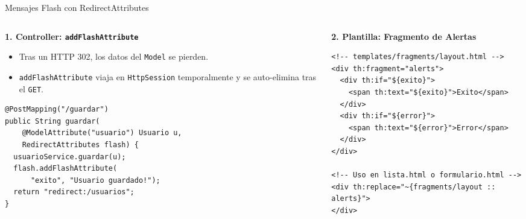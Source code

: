 \documentclass[aspectratio=169]{beamer}
\begin{document}
\begin{frame}[fragile]{Mensajes Flash con RedirectAttributes}
\begin{columns}[c]
\begin{column}{0.48\textwidth}
  \textbf{1. Controller: \texttt{addFlashAttribute}}
  \begin{itemize}
    \item Tras un HTTP 302, los datos del \texttt{Model} se pierden.
    \item \texttt{addFlashAttribute} viaja en \texttt{HttpSession} temporalmente y se auto-elimina tras el \texttt{GET}.
  \end{itemize}
\begin{lstlisting}[style=SpringCodeStyle]
@PostMapping("/guardar")
public String guardar(
    @ModelAttribute("usuario") Usuario u,
    RedirectAttributes flash) {
  usuarioService.guardar(u);
  flash.addFlashAttribute(
      "exito", "Usuario guardado!");
  return "redirect:/usuarios";
}
\end{lstlisting}
\end{column}
\begin{column}{0.50\textwidth}
  \textbf{2. Plantilla: Fragmento de Alertas}
\begin{lstlisting}[style=ThymeleafStyle]
<!-- templates/fragments/layout.html -->
<div th:fragment="alerts">
  <div th:if="${exito}">
    <span th:text="${exito}">Exito</span>
  </div>
  <div th:if="${error}">
    <span th:text="${error}">Error</span>
  </div>
</div>

<!-- Uso en lista.html o formulario.html -->
<div th:replace="~{fragments/layout :: alerts}">
</div>
\end{lstlisting}
\end{column}
\end{columns}
\end{frame}


\end{document}

